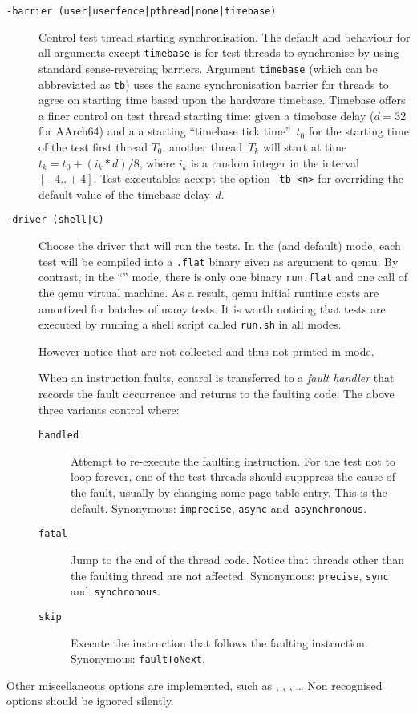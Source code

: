 \begin{description}
\item[{\tt -barrier (user|userfence|pthread|none|timebase)}]
Control test thread starting synchronisation. The default and
behaviour for all arguments except \texttt{timebase} is for test
threads to synchronise by using
standard 
{sense-reversing barriers}. Argument \texttt{timebase} (which can be abbreviated
as \texttt{tb}) uses the same synchronisation barrier for threads to
agree on starting time based upon the hardware timebase. Timebase
offers a finer control on test thread starting time: given a timebase
delay ($d=32$ for AArch64) and a a starting ``timebase tick
time''~$t_0$ for the starting time of the test first thread $T_0$,
another thread~$T_k$ will start at time $t_k = t_0+(i_k*d)/8$, where
$i_k$ is a random integer in the interval $[-4..+4]$. Test executables
accept the option \texttt{-tb <n>} for overriding the default value
of the timebase delay~$d$.

\item[{\tt -driver (shell|C)}] Choose the driver that will run the tests.
In the  (and default) mode, each test will be compiled into
a \texttt{.flat} binary given as argument to qemu. By contrast, in the
``'' mode, there is only one binary \texttt{run.flat} and one
call of the qemu virtual machine. As a result, qemu initial runtime
costs are amortized for batches of many tests. It is worth noticing
that tests are executed by running a shell script called
\texttt{run.sh} in all modes.

However notice that 
are not collected and thus not  printed in  mode.

\item[] When
an instruction faults, control is transferred to a \emph{fault
handler} that records the fault occurrence and returns to the faulting
code. The above three variants control where:
\begin{description}
\item[{\tt handled}] Attempt to re-execute the faulting
instruction. For the test not to loop forever, one of the test threads
should supppress the cause of the fault, usually by changing some page
table entry. This is the
default. Synonymous: \texttt{imprecise}, \texttt{async}  and~\texttt{asynchronous}.
\item[{\tt fatal}] Jump to the end of the thread code. Notice that
threads other than the faulting thread are not
affected. Synonymous: \texttt{precise}, \texttt{sync} and~\texttt{synchronous}.
\item[{\tt skip}] Execute the instruction that follows the faulting
instruction. Synonymous: \texttt{faultToNext}.
\end{description}
\end{description}
Other miscellaneous options are implemented, such
as ,
,
,
\ldots{}
Non recognised options should be ignored silently.
